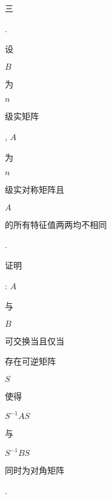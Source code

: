 \documentclass[10pt]{article}
\begin{document}
\begin{CJK}{UTF8}{mj}三\end{CJK}. \begin{CJK}{UTF8}{mj}设\end{CJK} $B$ \begin{CJK}{UTF8}{mj}为\end{CJK} $n$ \begin{CJK}{UTF8}{mj}级实矩阵\end{CJK}, $A$ \begin{CJK}{UTF8}{mj}为\end{CJK} $n$ \begin{CJK}{UTF8}{mj}级实对称矩阵且\end{CJK} $A$ \begin{CJK}{UTF8}{mj}的所有特征值两两均不相同\end{CJK}. \begin{CJK}{UTF8}{mj}证明\end{CJK}: $A$ \begin{CJK}{UTF8}{mj}与\end{CJK} $B$ \begin{CJK}{UTF8}{mj}可交换当且仅当\end{CJK} \begin{CJK}{UTF8}{mj}存在可逆矩阵\end{CJK} $S$ \begin{CJK}{UTF8}{mj}使得\end{CJK} $S^{-1} A S$ \begin{CJK}{UTF8}{mj}与\end{CJK} $S^{-1} B S$ \begin{CJK}{UTF8}{mj}同时为对角矩阵\end{CJK}.
\end{document}

